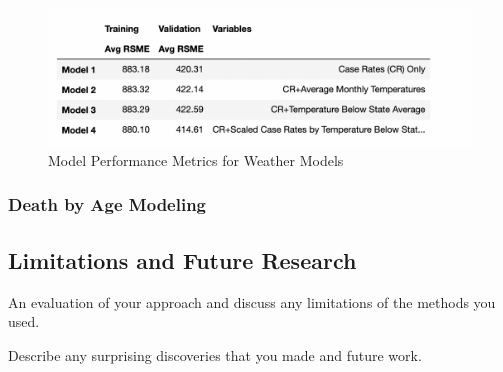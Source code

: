 \documentclass[11pt]{article}
\begin{document}
\begin{figure}[h]
\centering
\includegraphics[scale=0.75]{"../figures/weather_model_report.png"}
\caption{Model Performance Metrics for Weather Models}
\end{figure}




\subsubsection{Death by Age Modeling}



\subsection{Limitations and Future Research}
 An evaluation of your approach and discuss any limitations of the methods you used.

Describe any surprising discoveries that you made and future work.





\end{document}
